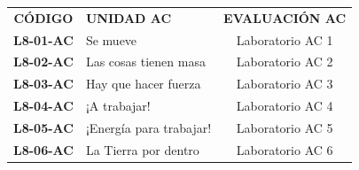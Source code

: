 \documentclass[11pt, letterpaper]{article}
\begin{document}
	
	
	\begin{center} 
		\small 
		\begin{tabularx}{\textwidth}{cXc} 
			\textbf{CÓDIGO} & \textbf{UNIDAD AC} & \textbf{EVALUACIÓN AC} \\ 
			\textbf{L8-01-AC} & Se mueve &  Laboratorio AC 1 \\ 
			\rowcolor{valgray} \textbf{L8-02-AC} & Las cosas tienen masa &  Laboratorio AC 2 \\ 
			\textbf{L8-03-AC} & Hay que hacer fuerza &  Laboratorio AC 3 \\ 
			\rowcolor{valgray} \textbf{L8-04-AC} & ¡A trabajar! &  Laboratorio AC 4 \\ 
			\textbf{L8-05-AC} & ¡Energía para trabajar! &  Laboratorio AC 5 \\ 
			\rowcolor{valgray} \textbf{L8-06-AC} & La Tierra por dentro &  Laboratorio AC 6 \\ 
		\end{tabularx} 
	\end{center} 
\end{document}
